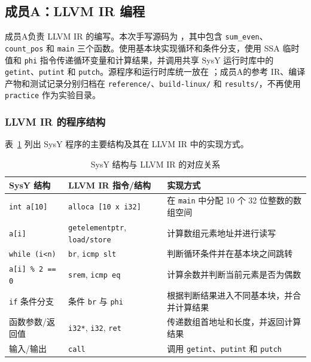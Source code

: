 \subsection{成员A：LLVM IR 编程}

成员A负责 LLVM IR 的编写。本次手写源码为 ，其中包含 \texttt{sum\_even}、\texttt{count\_pos} 和 \texttt{main} 三个函数。使用基本块实现循环和条件分支，使用 SSA 临时值和 \texttt{phi} 指令传递循环变量和计算结果，并调用共享 SysY 运行时库中的 \texttt{getint}、\texttt{putint} 和 \texttt{putch}。源程序和运行时库统一放在 ；成员A的参考 IR、编译产物和测试记录分别归档在 \texttt{reference/}、\texttt{build-linux/} 和 \texttt{results/}，不再使用 \texttt{practice} 作为实验目录。

\subsubsection{LLVM IR 的程序结构}

表~\ref{tab:q2-llvm-structure} 列出 SysY 程序的主要结构及其在 LLVM IR 中的实现方式。

\begin{table}[H]
\centering

\begin{tabularx}{0.94\linewidth}{>{\ttfamily}p{3.2cm} >{\ttfamily}p{4.1cm} X}
\toprule
\normalfont SysY 结构 & \normalfont LLVM IR 指令/结构 & \normalfont 实现方式 \\
\midrule
\texttt{int a[10]} & \texttt{alloca [10 x i32]} & 在 \texttt{main} 中分配 10 个 32 位整数的数组空间 \\
\texttt{a[i]} & \texttt{getelementptr}, \texttt{load/store} & 计算数组元素地址并进行读写 \\
\texttt{while (i<n)} & \texttt{br}, \texttt{icmp slt} & 判断循环条件并在基本块之间跳转 \\
\texttt{a[i] \% 2 == 0} & \texttt{srem}, \texttt{icmp eq} & 计算余数并判断当前元素是否为偶数 \\
\texttt{if} 条件分支 & 条件 \texttt{br} 与 \texttt{phi} & 根据判断结果进入不同基本块，并合并计算结果 \\
函数参数/返回值 & \texttt{i32*}, \texttt{i32}, \texttt{ret} & 传递数组首地址和长度，并返回计算结果 \\
输入/输出 & \texttt{call} & 调用 \texttt{getint}、\texttt{putint} 和 \texttt{putch} \\
\bottomrule
\end{tabularx}
\caption{SysY 结构与 LLVM IR 的对应关系}
\label{tab:q2-llvm-structure}
\end{table}

